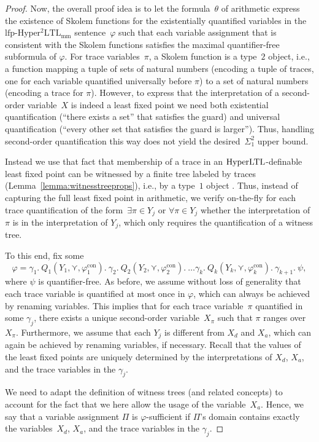 \documentclass[dvipsnames,10pt,a4paper]{amsart}
\theoremstyle{definition}
\theoremstyle{remark}
\renewcommand{\phi}{\varphi}
\newcommand{\hyltl}{\mathrm{Hyper\-LTL}\xspace}
\newcommand{\lfpsohyltlfp}{\mathrm{lfp\text{-}{Hyper^2LTL_{\mathrm{mm}}}}\xspace}
\newcommand{\univar}{X_a}
\newcommand{\unidisvar}{X_d}
\newcommand{\smallest}{\curlyvee}
\newcommand{\myquot}[1]{``#1''}
\newcommand{\con}{\mathrm{con}}
\newcommand{\quant}{Q}
\begin{document}
\begin{proof}
Now, the overall proof idea is to let the formula~$\theta$ of arithmetic express the existence of Skolem functions for the existentially quantified variables in the $\lfpsohyltlfp$ sentence~$\phi$ such that each variable assignment that is consistent with the Skolem functions satisfies the maximal quantifier-free subformula of $\varphi$.
For trace variables~$\pi$, a Skolem function is a type~$2$ object, i.e., a function mapping a tuple of sets of natural numbers (encoding a tuple of traces, one for each variable quantified universally before $\pi$) to a set of natural numbers (encoding a trace for $\pi$).
However, to express that the interpretation of a second-order variable~$X$ is indeed a least fixed point we need both existential quantification (\myquot{there exists a set} that satisfies the guard) and universal quantification (\myquot{every other set that satisfies the guard is larger}).
Thus, handling second-order quantification this way does not yield the desired~$\Sigma_1^2$ upper bound. 

Instead we use that fact that membership of a trace in an $\hyltl$-definable least fixed point can be witnessed by a finite tree labeled by traces (Lemma~\ref{lemma:witnesstreeprops}), i.e., by a type~$1$ object .
Thus, instead of capturing the full least fixed point in arithmetic, we verify on-the-fly for each trace quantification of the form~$\exists \pi \in Y_j$ or $\forall \pi \in Y_j$ whether the interpretation of $\pi$ is in the interpretation of $Y_j$, which only requires the quantification of a witness tree.

To this end, fix some \[
\phi = 
\gamma_1.\ \quant_1(Y_1, \smallest, \phi_1^\con).\ 
\gamma_2.\ \quant_2(Y_2, \smallest, \phi_2^\con).\ 
\ldots 
\gamma_k.\ \quant_k(Y_k, \smallest, \phi_k^\con).\
\gamma_{k+1}.\
\psi,
\]
where $\psi$ is quantifier-free.
As before, we assume without loss of generality that each trace variable is quantified at most once in $\varphi$, which can always be achieved by renaming variables. This implies that for each trace variable~$\pi$ quantified in some $\gamma_j$, there exists a unique second-order variable~$X_\pi$ such that $\pi$ ranges over $X_\pi$. 
Furthermore, we assume that each $Y_j$ is different from $\unidisvar$ and $\univar$, which can again be achieved by renaming variables, if necessary.
Recall that the values of the least fixed points are uniquely determined by the interpretations of $\unidisvar$, $\univar$, and the trace variables in the $\gamma_j$. 

We need to adapt the definition of witness trees (and related concepts) to account for the fact that we here allow the usage of the variable~$\univar$.
Hence, we say that a variable assignment $\Pi$ is $\phi$-sufficient if $\Pi$'s domain contains exactly the variables~$\unidisvar$, $\univar$, and the trace variables in the $\gamma_j$. 


\end{proof}
\end{document}

